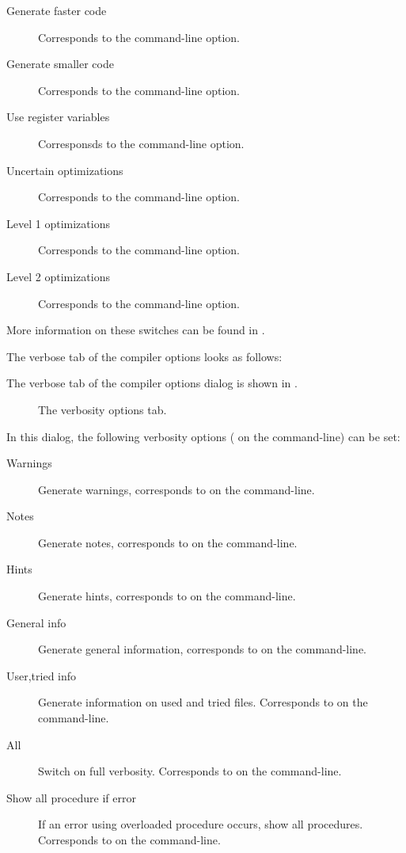 \begin{description}
\begin{description}
\item[Generate faster code] Corresponds to the  command-line option.
\item[Generate smaller code] Corresponds to the  command-line option.
\item[Use register variables] Corresponsds to the  command-line
option.
\item[Uncertain optimizations] Corresponds to the  command-line
option.
\item[Level 1 optimizations] Corresponds to the  command-line
option.
\item[Level 2 optimizations] Corresponds to the  command-line
option.
\end{description}
\end{description}
More information on these switches can be found in .

\begin{htmlonly}
The verbose tab of the compiler options looks as follows:
\end{htmlonly}
\begin{latexonly}
The verbose tab of the compiler options dialog is shown in
.
\begin{figure}[ht]
\begin{center}
\caption{The verbosity options tab.}\label{fig:ocompc}
\ifpdf
{}
\else
{}
\fi
\end{center}
\end{figure}
\end{latexonly}
In this dialog, the following verbosity options ( on the
command-line) can be set:
\begin{description}
\item[Warnings] Generate warnings, corresponds to  on the
command-line.
\item[Notes] Generate notes, corresponds to  on the
command-line.
\item[Hints] Generate hints, corresponds to  on the
command-line.
\item[General info] Generate general information, corresponds to  on the
command-line.
\item[User,tried info] Generate information on used and tried files. Corresponds to  on the
command-line.
\item[All] Switch on full verbosity. Corresponds to  on the
command-line.
\item[Show all procedure if error] If an error using overloaded procedure
occurs, show all procedures. Corresponds to  on the
command-line.
\end{description}

